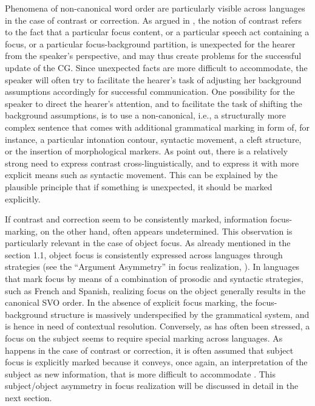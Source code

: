 Phenomena of non-canonical word order are particularly visible across languages in the case of contrast or correction. As argued in \textcite{zimmermann2008contrastive, REPP20101333}, the notion of contrast refers to the fact that a particular focus content, or a particular speech act containing a focus, or a particular focus-background partition, is unexpected for the hearer from the speaker’s perspective, and may thus create problems for the successful update of the CG. Since unexpected facts are more difficult to accommodate, the speaker will often try to facilitate the hearer’s task of adjusting her background assumptions accordingly for successful communication. One possibility for the speaker to direct the hearer’s attention, and to facilitate the task of shifting the background assumptions, is to use a non-canonical, i.e., a structurally more complex sentence that comes with additional grammatical marking in form of, for instance, a particular intonation contour, syntactic movement, a cleft structure, or the insertion of morphological markers. As \textcite{krifka2012expression} point out, there is a relatively strong need to express contrast cross-linguistically, and to express it with more explicit means such as syntactic movement. This can be explained by the plausible principle that if something is unexpected, it should be marked explicitly. 

If contrast and correction seem to be consistently marked, information focus-marking, on the other hand, often appears undetermined. This observation is particularly relevant in the case of object focus. As already mentioned in the section 1.1, object focus is consistently expressed across languages through  strategies (see the ``Argument Asymmetry” in focus realization, \cite{skopeteas2010focus}). In languages that mark focus by means of a combination of prosodic and syntactic strategies, such as French and Spanish, realizing focus on the object generally results in the canonical SVO order. In the absence of explicit focus marking, the focus-background structure is massively underspecified by the grammatical system, and is hence in need of contextual resolution. Conversely, as has  often been stressed, a focus on the subject seems to require special marking across languages. As happens in the case of contrast or correction, it is often assumed that subject focus is explicitly marked because it conveys, once again, an  interpretation of the subject as new information, that is more difficult to accommodate \parencite{lambrecht2000subjects}.
This subject/object asymmetry in focus realization will be discussed in detail in the next section.


